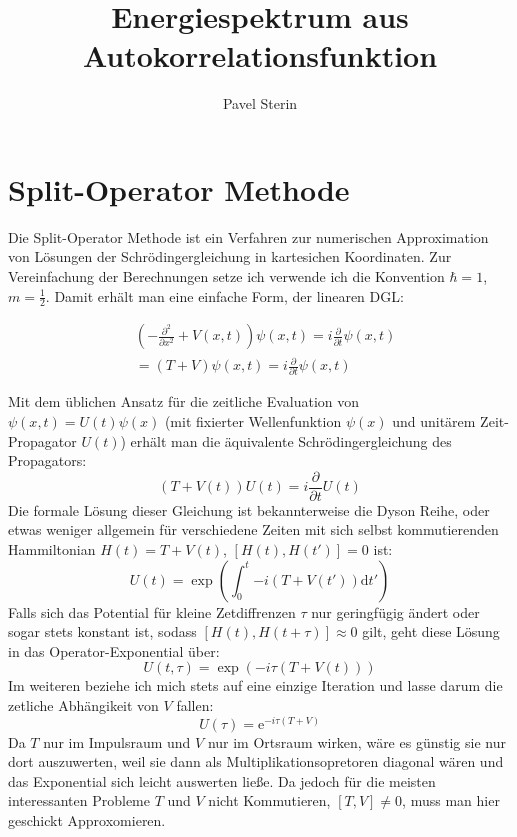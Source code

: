 \documentclass[10pt,a4paper,german]{scrartcl}
\title{Energiespektrum aus Autokorrelationsfunktion}
\author{Pavel Sterin}
\begin{document}
	\maketitle
	\section{Split-Operator Methode}
		Die Split-Operator Methode ist ein Verfahren zur numerischen Approximation
		von Lösungen der Schrödingergleichung in kartesichen Koordinaten. Zur Vereinfachung
		der Berechnungen setze ich verwende ich die Konvention $\hbar = 1$, $m=\frac{1}{2}$.
		Damit erhält man eine einfache Form, der linearen DGL:

		\begin{align*}
				&\left(-\frac{\partial^2}{\partial x^2} + V(x,t)\right)\psi(x,t) 
					= i \frac{\partial}{\partial t}\psi(x,t) \\
				&= \left(T + V\right)\psi(x,t)
					= i \frac{\partial}{\partial t}\psi(x,t)
		\end{align*}
		
		Mit dem üblichen Ansatz für die zeitliche Evaluation von $ \psi(x,t)=U(t)\psi(x) $
		(mit fixierter Wellenfunktion $\psi(x)$ und unitärem Zeit-Propagator $U(t)$) erhält man
		die äquivalente Schrödingergleichung des Propagators:
		\begin{equation*}
			\left(T + V(t)\right) U(t) = i  \frac{\partial}{\partial t}U(t)
		\end{equation*}
		Die formale Lösung dieser Gleichung ist bekannterweise die Dyson Reihe, oder etwas
		weniger allgemein für verschiedene Zeiten mit sich selbst kommutierenden Hammiltonian
		$H(t)=T+V(t)$, $[H(t),H(t')]=0$ ist:
		\begin{equation*}
			U(t)=\exp\left(\int_{0}^{t}{-i (T+V(t')) \mathrm{d} t'}\right)		
		\end{equation*}
		Falls sich das Potential für kleine Zetdiffrenzen $\tau$ nur geringfügig ändert oder
		sogar stets konstant ist, sodass $[H(t),H(t+\tau)]\approx 0$ gilt, geht diese Lösung
		in das Operator-Exponential über:
		\begin{equation*}
			U(t,\tau)=\exp\left(-i \tau (T+V(t))\right)
		\end{equation*}
		Im weiteren beziehe ich mich stets auf eine einzige Iteration und lasse darum die
		zetliche Abhängikeit von $V$ fallen:
		\begin{equation}\label{eq:exp}
			U(\tau)=\mathrm{e}^{-i \tau (T+V)}
		\end{equation}
		Da $T$ nur im Impulsraum und $V$ nur im Ortsraum wirken, wäre es günstig sie nur dort
		auszuwerten, weil sie dann als Multiplikationsopretoren diagonal wären und
		das Exponential sich leicht auswerten ließe. Da jedoch für die meisten interessanten 
		Probleme $T$ und $V$ nicht Kommutieren, $[T,V]\neq 0$, muss man hier geschickt
		Approxomieren. 
		
\end{document}
